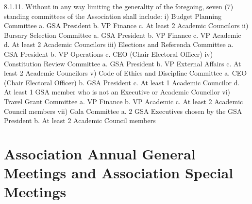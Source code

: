 \documentclass{article}
\begin{document}
8.1.11. Without in any way limiting the generality of the foregoing, seven 
(7) standing committees of the Association shall include: 
i) Budget Planning Committee 
a. GSA President 
b. VP Finance 
c. At least 2 Academic Councilors 
ii) Bursary Selection Committee 
a. GSA President 
b. VP Finance 
c. VP Academic 
d. At least 2 Academic Councilors 
iii) Elections and Referenda Committee 
a. GSA President 
b. VP Operations 
c. CEO (Chair Electoral Officer) 
iv) Constitution Review Committee 
a. GSA President 
b. VP External Affairs 
c. At least 2 Academic Councilors 
v) Code of Ethics and Discipline Committee 
a. CEO (Chair Electoral Officer) 
b. GSA President 
c. At least 1 Academic Councilor 
d. At least 1 GSA member who is not an Executive or Academic 
 Councilor 
vi) Travel Grant Committee 
a. VP Finance 
b. VP Academic 
c. At least 2 Academic Council members 
vii) Gala Committee 
a. 2 GSA Executives chosen by the GSA President 
b. At least 2 Academic Council members 
\section{ Association Annual General Meetings and Association Special  Meetings }
\end{document}
